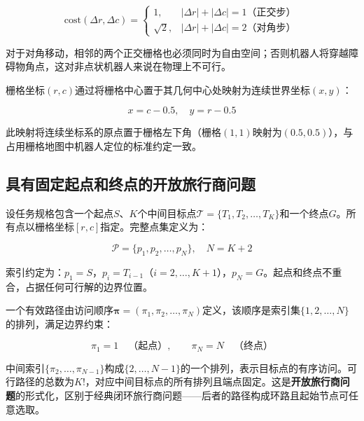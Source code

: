 \documentclass[lettersize,journal]{IEEEtran}
\begin{document}
\begin{equation}
\mathrm{cost}(\Delta r, \Delta c) =
\begin{cases}
1, & |\Delta r| + |\Delta c| = 1 \text{（正交步）} \\
\sqrt{2}, & |\Delta r| + |\Delta c| = 2 \text{（对角步）}
\end{cases}
\label{eq:stepcost}
\end{equation}

对于对角移动，相邻的两个正交栅格也必须同时为自由空间；否则机器人将穿越障碍物角点，这对非点状机器人来说在物理上不可行。

栅格坐标$(r, c)$通过将栅格中心置于其几何中心处映射为连续世界坐标$(x, y)$：

\begin{equation}
x = c - 0.5, \quad y = r - 0.5
\label{eq:coord}
\end{equation}

此映射将连续坐标系的原点置于栅格左下角（栅格$(1,1)$映射为$(0.5, 0.5)$），与占用栅格地图中机器人定位的标准约定一致。

\subsection{具有固定起点和终点的开放旅行商问题}

\label{subsec:otspp}

设任务规格包含一个起点$S$、$K$个中间目标点$\mathcal{T} = \{T_1, T_2, \dots, T_K\}$和一个终点$G$。所有点以栅格坐标$[r, c]$指定。完整点集定义为：

\begin{equation}
\mathcal{P} = \{p_1, p_2, \dots, p_N\}, \quad N = K + 2
\label{eq:pset}
\end{equation}

索引约定为：$p_1 = S$，$p_i = T_{i-1}$（$i = 2, \dots, K+1$），$p_N = G$。起点和终点不重合，占据任何可行解的边界位置。

一个有效路径由访问顺序$\bm{\pi} = (\pi_1, \pi_2, \dots, \pi_N)$定义，该顺序是索引集$\{1, 2, \dots, N\}$的排列，满足边界约束：

\begin{equation}
\pi_1 = 1 \quad \text{（起点）}, \qquad \pi_N = N \quad \text{（终点）}
\label{eq:boundary}
\end{equation}

中间索引$\{\pi_2, \dots, \pi_{N-1}\}$构成$\{2, \dots, N-1\}$的一个排列，表示目标点的有序访问。可行路径的总数为$K!$，对应中间目标点的所有排列且端点固定。这是\textbf{开放旅行商问题}的形式化，区别于经典闭环旅行商问题——后者的路径构成环路且起始节点可任意选取\textcolor{blue}{\cite{ref3,ref4}}。
\end{document}
